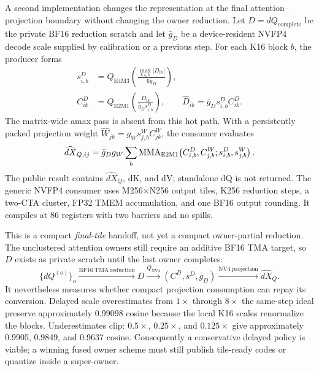 A second implementation changes the representation at the final
attention--projection boundary without changing the owner reduction.  Let
$D=dQ_{\mathrm{complete}}$ be the private BF16 reduction scratch and let
$\bar g_D$ be a device-resident NVFP4 decode scale supplied by calibration or
a previous step.  For each K16 block $b$, the producer forms
\begin{align}
  s^D_{i,b}
    &=Q_{\mathrm{E4M3}}\!\left(
      \frac{\max_{k\in b}|D_{ik}|}{6\bar g_D}
    \right),\\
  C^D_{ik}
    &=Q_{\mathrm{E2M1}}\!\left(
      \frac{D_{ik}}{\bar g_Ds^D_{i,b}}
    \right),
  \qquad
  \widehat D_{ik}=\bar g_Ds^D_{i,b}C^D_{ik}.
  \label{eq:compact-dq-nvfp4}
\end{align}
The matrix-wide amax pass is absent from this hot path.  With a persistently
packed projection weight
$\widehat W_{jk}=g_Ws^W_{j,b}C^W_{jk}$, the consumer evaluates
\begin{equation}
  \widehat{dX}_{Q,ij}
  =\bar g_Dg_W\sum_b
    \operatorname{MMA}_{\mathrm{E2M1}}\!\left(
      C^D_{i,b},C^W_{j,b};s^D_{i,b},s^W_{j,b}
    \right).
  \label{eq:compact-dq-nvfp4-projection}
\end{equation}
The public result contains $\widehat{dX}_Q$, dK, and dV; standalone dQ is not
returned.  The generic NVFP4 consumer uses M256$\times$N256 output tiles,
K256 reduction steps, a two-CTA cluster, FP32 TMEM accumulation, and one BF16
output rounding.  It compiles at 86 registers with two barriers and no spills.

This is a compact \emph{final-tile} handoff, not yet a compact owner-partial
reduction.  The unclustered attention owners still require an additive BF16
TMA target, so $D$ exists as private scratch until the last owner completes:
\begin{equation}
  \{dQ^{(o)}\}_o
  \xrightarrow{\mathrm{BF16\ TMA\ reduction}}
  D
  \xrightarrow{Q_{\mathrm{NV4}}}
  (C^D,s^D,\bar g_D)
  \xrightarrow{\mathrm{NV4\ projection}}
  \widehat{dX}_Q.
  \label{eq:compact-dq-current-boundary}
\end{equation}
It nevertheless measures whether compact projection consumption can repay its
conversion.  Delayed scale overestimates from $1\times$ through $8\times$ the
same-step ideal preserve approximately 0.99098 cosine because the local K16
scales renormalize the blocks.  Underestimates clip: $0.5\times$, $0.25\times$,
and $0.125\times$ give approximately 0.9905, 0.9849, and 0.9637 cosine.
Consequently a conservative delayed policy is viable; a winning fused owner
scheme must still publish tile-ready codes or quantize inside a super-owner.


